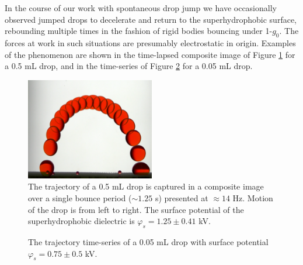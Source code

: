 \documentclass[aip,reprint, floatfix]{revtex4-1}
\begin{document}
In the course of our work with spontaneous drop jump we have occasionally observed jumped drops to decelerate and return to the superhydrophobic surface, rebounding multiple times in the fashion of rigid bodies bouncing under 1-$g_0$. The forces at work in such situations are presumably electrostatic in origin. Examples of the phenomenon are shown in the time-lapsed composite image of Figure \ref{fig:bounce} for a 0.5 mL drop, and in the time-series of Figure \ref{fig:bounce_time} for a 0.05 mL drop.
\begin{figure}[htb]
\centering
\includegraphics[width=0.5\textwidth]{bounce.png}
\caption{The trajectory of a 0.5 mL drop is captured in a composite image over a single bounce period ($\sim 1.25$ s) presented at $\approx 14$ Hz. Motion of the drop is from left to right. The surface potential of the superhydrophobic dielectric is $\varphi_s = 1.25 \pm 0.41$ kV. \label{fig:bounce}}
\end{figure}

\begin{figure}[htb]
\centering
\resizebox{0.5\textwidth}{!}{}
\caption{The trajectory time-series of a 0.05 mL drop with surface potential $\varphi_s = 0.75 \pm 0.5$ kV. \label{fig:bounce_time}}
\end{figure}
\end{document}
